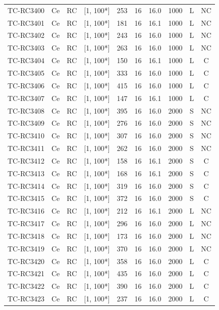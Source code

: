 \begin{longtable}{lccccccccc}
TC-RC3400 & Ce & RC & [1, 100*] & 253 & 16 & 16.0 & 1000 & L & NC \\
TC-RC3401 & Ce & RC & [1, 100*] & 181 & 16 & 16.1 & 1000 & L & NC \\
TC-RC3402 & Ce & RC & [1, 100*] & 243 & 16 & 16.0 & 1000 & L & NC \\
TC-RC3403 & Ce & RC & [1, 100*] & 263 & 16 & 16.0 & 1000 & L & NC \\
TC-RC3404 & Ce & RC & [1, 100*] & 150 & 16 & 16.1 & 1000 & L & C \\
TC-RC3405 & Ce & RC & [1, 100*] & 333 & 16 & 16.0 & 1000 & L & C \\
TC-RC3406 & Ce & RC & [1, 100*] & 415 & 16 & 16.0 & 1000 & L & C \\
TC-RC3407 & Ce & RC & [1, 100*] & 147 & 16 & 16.1 & 1000 & L & C \\
TC-RC3408 & Ce & RC & [1, 100*] & 395 & 16 & 16.0 & 2000 & S & NC \\
TC-RC3409 & Ce & RC & [1, 100*] & 276 & 16 & 16.0 & 2000 & S & NC \\
TC-RC3410 & Ce & RC & [1, 100*] & 307 & 16 & 16.0 & 2000 & S & NC \\
TC-RC3411 & Ce & RC & [1, 100*] & 262 & 16 & 16.0 & 2000 & S & NC \\
TC-RC3412 & Ce & RC & [1, 100*] & 158 & 16 & 16.1 & 2000 & S & C \\
TC-RC3413 & Ce & RC & [1, 100*] & 168 & 16 & 16.1 & 2000 & S & C \\
TC-RC3414 & Ce & RC & [1, 100*] & 319 & 16 & 16.0 & 2000 & S & C \\
TC-RC3415 & Ce & RC & [1, 100*] & 372 & 16 & 16.0 & 2000 & S & C \\
TC-RC3416 & Ce & RC & [1, 100*] & 212 & 16 & 16.1 & 2000 & L & NC \\
TC-RC3417 & Ce & RC & [1, 100*] & 296 & 16 & 16.0 & 2000 & L & NC \\
TC-RC3418 & Ce & RC & [1, 100*] & 173 & 16 & 16.0 & 2000 & L & NC \\
TC-RC3419 & Ce & RC & [1, 100*] & 370 & 16 & 16.0 & 2000 & L & NC \\
TC-RC3420 & Ce & RC & [1, 100*] & 358 & 16 & 16.0 & 2000 & L & C \\
TC-RC3421 & Ce & RC & [1, 100*] & 435 & 16 & 16.0 & 2000 & L & C \\
TC-RC3422 & Ce & RC & [1, 100*] & 390 & 16 & 16.0 & 2000 & L & C \\
TC-RC3423 & Ce & RC & [1, 100*] & 237 & 16 & 16.0 & 2000 & L & C \\

\end{longtable}
